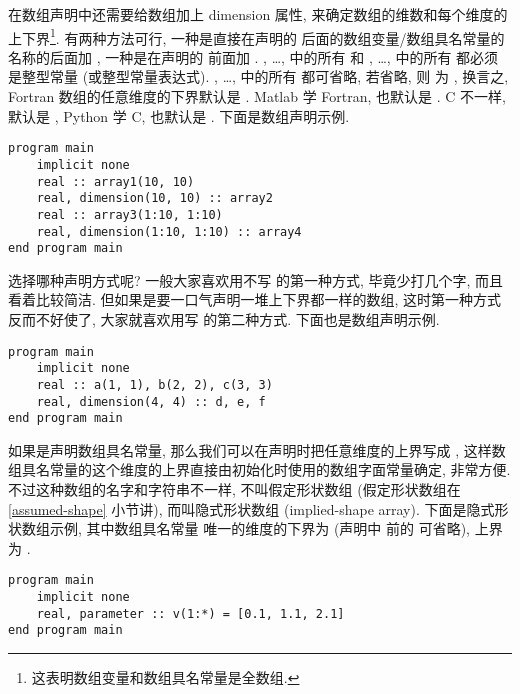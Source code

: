 在数组声明中还需要给数组加上 dimension 属性, 来确定数组的维数和每个维度的上下界\footnote{这表明数组变量和数组具名常量是全数组.}. 有两种方法可行, 一种是直接在声明的 \ttt{::} 后面的数组变量/数组具名常量的名称的后面加 , 一种是在声明的 \ttt{::} 前面加 . , \dots,  中的所有  和 , \dots,  中的所有  都必须是整型常量 (或整型常量表达式). , \dots,  中的所有  都可省略, 若省略, 则  为 , 换言之, Fortran 数组的任意维度的下界默认是 . Matlab 学 Fortran, 也默认是 . C 不一样, 默认是 , Python 学 C, 也默认是 . 下面是数组声明示例.
\begin{lstlisting}
program main
    implicit none
    real :: array1(10, 10)
    real, dimension(10, 10) :: array2
    real :: array3(1:10, 1:10)
    real, dimension(1:10, 1:10) :: array4
end program main
\end{lstlisting}
选择哪种声明方式呢? 一般大家喜欢用不写  的第一种方式, 毕竟少打几个字, 而且看着比较简洁. 但如果是要一口气声明一堆上下界都一样的数组, 这时第一种方式反而不好使了, 大家就喜欢用写  的第二种方式. 下面也是数组声明示例.
\begin{lstlisting}
program main
    implicit none
    real :: a(1, 1), b(2, 2), c(3, 3)
    real, dimension(4, 4) :: d, e, f
end program main
\end{lstlisting}

如果是声明数组具名常量, 那么我们可以在声明时把任意维度的上界写成 \ttt{*}, 这样数组具名常量的这个维度的上界直接由初始化时使用的数组字面常量确定, 非常方便. 不过这种数组的名字和字符串不一样, 不叫假定形状数组 (假定形状数组在 \ref{assumed-shape} 小节讲), 而叫隐式形状数组 (implied-shape array). 下面是隐式形状数组示例, 其中数组具名常量  唯一的维度的下界为  (声明中 \ttt{*} 前的  可省略), 上界为 .
\begin{lstlisting}
program main
    implicit none
    real, parameter :: v(1:*) = [0.1, 1.1, 2.1]
end program main
\end{lstlisting}

